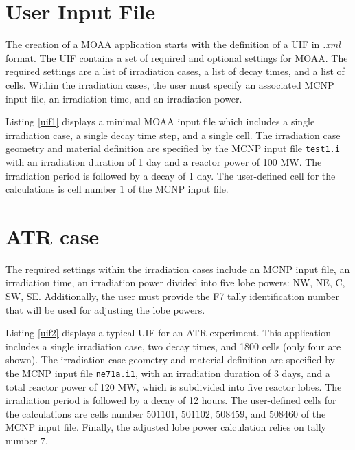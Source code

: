 \label{ref:moaa-exec}

\section{User Input File}
\label{sec:uif}

The creation of a MOAA application starts with the definition of a \gls*{UIF} in \textit{.xml} format.
The UIF contains a set of required and optional settings for MOAA.
The required settings are a list of irradiation cases, a list of decay times, and a list of cells.
Within the irradiation cases, the user must specify an associated MCNP input file, an irradiation time, and an irradiation power.

Listing \ref{uif1} displays a minimal MOAA input file which includes a single irradiation case, a single decay time step, and a single cell.
The irradiation case geometry and material definition are specified by the MCNP input file \texttt{test1.i} with an irradiation duration of 1 day and a reactor power of 100 MW.
The irradiation period is followed by a decay of 1 day.
The user-defined cell for the calculations is cell number $1$ of the MCNP input file.



\section{ATR case}
\label{sec:ap-atr}

The required settings within the irradiation cases include an MCNP input file, an irradiation time, an irradiation power divided into five lobe powers: NW, NE, C, SW, SE.
Additionally, the user must provide the F7 tally identification number that will be used for adjusting the lobe powers.

Listing \ref{uif2} displays a typical UIF for an ATR experiment.
This application includes a single irradiation case, two decay times, and 1800 cells (only four are shown).
The irradiation case geometry and material definition are specified by the MCNP input file \texttt{ne71a.i1}, with an irradiation duration of 3 days, and a total reactor power of 120 MW, which is subdivided into five reactor lobes.
The irradiation period is followed by a decay of 12 hours.
The user-defined cells for the calculations are cells number $501101$, $501102$, $508459$, and $508460$ of the MCNP input file.
Finally, the adjusted lobe power calculation relies on tally number $7$.



